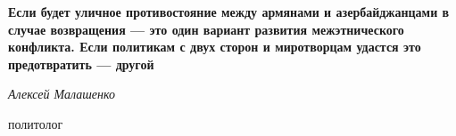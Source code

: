 \begin{leftbar}
	\begingroup
	\color{orange}
	\bfseries
Если будет уличное противостояние между армянами и азербайджанцами в случае
возвращения — это один вариант развития межэтнического конфликта. Если
политикам с двух сторон и миротворцам удастся это предотвратить —
другой\par
	\endgroup
\em
Алексей Малашенко\par
политолог\par
\end{leftbar}
